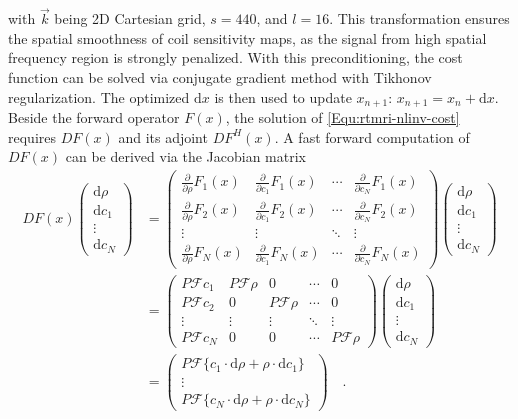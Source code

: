 with $\vec{k}$ being 2D Cartesian grid, $s = 440$, and $l = 16$. This transformation ensures the spatial smoothness of coil sensitivity maps, as the signal from high spatial frequency region is strongly penalized. With this preconditioning, the cost function can be solved via conjugate gradient method with Tikhonov regularization. The optimized $\text{d}x$ is then used to update $x_{n+1}$: $x_{n+1} = x_n + \text{d}x$. Beside the forward operator $F(x)$, the solution of \cref{Equ:rtmri-nlinv-cost} requires $DF(x)$ and its adjoint $DF^{H} (x)$. A fast forward computation of $DF(x)$ can be derived via the Jacobian matrix
\begin{align}
  DF(x) \begin{pmatrix}
    \text{d} \rho \\
    \text{d} c_1 \\
    \vdots \\
    \text{d} c_N
  \end{pmatrix} 
  &= \begin{pmatrix}
    \frac{\partial}{\partial \rho} F_1 (x) & \frac{\partial}{\partial c_1} F_1 (x) & \cdots & \frac{\partial}{\partial c_N} F_1 (x) \\
    \frac{\partial}{\partial \rho} F_2 (x) & \frac{\partial}{\partial c_1} F_2 (x) & \cdots & \frac{\partial}{\partial c_N} F_2 (x) \\
    \vdots & \vdots & \ddots & \vdots \\
    \frac{\partial}{\partial \rho} F_N (x) & \frac{\partial}{\partial c_1} F_N (x) & \cdots & \frac{\partial}{\partial c_N} F_N (x) 
  \end{pmatrix} \begin{pmatrix}
    \text{d} \rho \\
    \text{d} c_1 \\
    \vdots \\
    \text{d} c_N
  \end{pmatrix} \nonumber \\
  &= \begin{pmatrix}
    P\mathcal{F}c_1 & P\mathcal{F}\rho & 0                & \cdots & 0 \\
    P\mathcal{F}c_2 & 0                & P\mathcal{F}\rho & \cdots & 0 \\
    \vdots          & \vdots           & \vdots           & \ddots & \vdots \\
    P\mathcal{F}c_N & 0                & 0                & \cdots & P\mathcal{F}\rho
  \end{pmatrix} \begin{pmatrix}
    \text{d} \rho \\
    \text{d} c_1 \\
    \vdots \\
    \text{d} c_N
  \end{pmatrix} \nonumber \\
  &= \begin{pmatrix}
    P\mathcal{F} \{ c_1 \cdot \text{d}\rho + \rho \cdot \text{d} c_1 \} \\
    \vdots \\
    P\mathcal{F} \{ c_N \cdot \text{d}\rho + \rho \cdot \text{d} c_N \} 
  \end{pmatrix} \quad . \label{Equ:rtmri-nlinv-der} 
\end{align}
